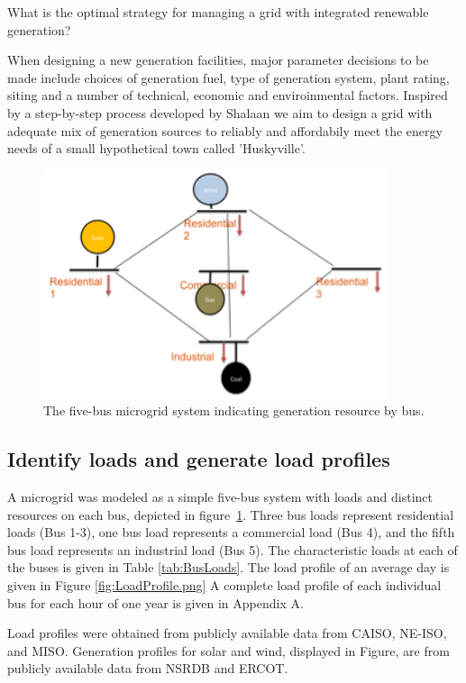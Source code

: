 \documentclass[a4paper]{article}
\begin{document}
What is the optimal strategy for managing a grid with integrated renewable generation? 

When designing a new generation facilities, major parameter decisions to be made include choices of generation fuel, type of generation system, plant rating, siting and a number of technical, economic and enviroinmental factors. Inspired by a step-by-step process developed by Shalaan \cite{shaalan2003generation} we aim to design a grid with adequate mix of generation sources to reliably and affordabily meet the energy needs of a small hypothetical town called 'Huskyville'. 

\begin{figure}[h!]
\centering
\includegraphics[width=0.9\textwidth]{FIG1a.png}
\caption{\label{fig:FIG1a}The five-bus microgrid system indicating generation resource by bus.}
\end{figure}

\subsection{Identify loads and generate load profiles} 

A microgrid was modeled as a simple five-bus system with loads and distinct resources on each bus, depicted in figure~\ref{fig:FIG1a}. Three bus loads represent residential loads (Bus 1-3), one bus load represents a commercial load (Bus 4), and the fifth bus load represents an industrial load (Bus 5). The characteristic loads at each of the buses is given in Table \ref{tab:BusLoads}. The load profile of an average day is given in Figure \ref{fig:LoadProfile.png} A complete load profile of each individual bus for each hour of one year is given in Appendix A. 

Load profiles were obtained from publicly available data from CAISO, NE-ISO, and MISO. Generation profiles for solar and wind, displayed in Figure, are from publicly available data from NSRDB and ERCOT.
\end{document}
